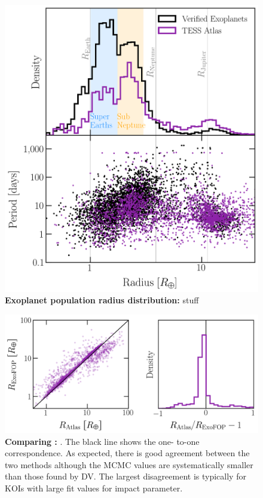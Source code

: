 \documentclass[floatfix,ApJL,twocolumn]{aastex631}
\begin{document}
\begin{figure}
  \includegraphics[width=\linewidth]{figures/radius_period_plot.png}
  \caption{\textbf{Exoplanet population radius distribution:} stuff }
  \label{fig:}
\end{figure}


\begin{figure}
  \includegraphics[width=\linewidth]{figures/radius_error.png}
  \caption{\textbf{Comparing :} . The black line shows the one- to-one correspondence. As expected, there is good agreement between the two methods although the MCMC values are systematically smaller than those found by DV. The largest disagreement is typically for KOIs with large fit values for impact parameter. }
  \label{fig:}
\end{figure}
\end{document}
